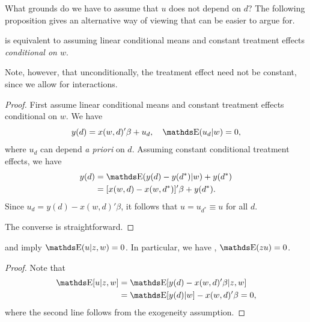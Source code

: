 \documentclass[letterpaper, 10pt]{article}
\begin{document}
What grounds do we have to assume that \(u\) does not depend on \(d\)?
The following proposition gives an alternative way of viewing  that can be easier to argue for.
\begin{proposition}
   is equivalent to assuming linear conditional means and constant treatment effects \emph{conditional on \(w\)}.
\end{proposition}
\begin{remark}
  Note, however, that unconditionally, the treatment effect need not be constant, since we allow for interactions.
\end{remark}
\begin{proof}
  First assume linear conditional means and constant treatment effects conditional on \(w\).
  We have
  \[
    y(d) = x(w, d)' \beta + u_d, \quad \E(u_d|w) = 0,
  \]
  where \(u_d\) can depend \emph{a priori} on \(d\).
  Assuming constant conditional treatment effects, we have
  \begin{align*}
    y(d)
    &= \E(y(d) - y(d^*)|w) + y(d^*) \\
    &= [x(w, d) - x(w, d^*)]' \beta + y(d^*).
  \end{align*}
  Since \(u_d = y(d) - x(w, d)' \beta\), it follows that \(u = u_{d^*} \equiv u\) for all \(d\).

  The converse is straightforward.
\end{proof}


\begin{proposition}
   and  imply \(\E(u|z, w) = 0\).
  In particular, we have , \(\E(zu) = 0\).
\end{proposition}
\begin{proof}
  Note that
  \begin{align*}
    \E[u|z, w]
    &= \E[y(d) - x(w, d)' \beta | z, w] \\
    &= \E[y(d) | w] - x(w, d)' \beta
    = 0,
  \end{align*}
  where the second line follows from the exogeneity assumption.
\end{proof}
\end{document}
